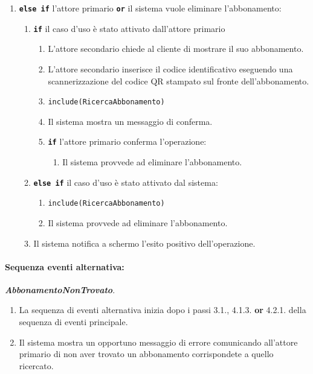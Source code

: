 \documentclass{article}
\begin{document}
\begin{enumerate}[itemsep=8pt,parsep=0pt]
  		\item \texttt{\textbf{else if}} l'attore primario  \texttt{\textbf{or}} il sistema vuole eliminare l'abbonamento:
		\begin{enumerate}	[leftmargin=28pt]
		\item \texttt{\textbf{if}} il caso d'uso è stato attivato dall'attore primario
        \begin{enumerate}	[leftmargin=28pt]
				\item L'attore secondario chiede al cliente di mostrare il suo abbonamento.
				\item L'attore secondario inserisce il codice identificativo eseguendo una scannerizzazione del codice QR stampato sul fronte dell'abbonamento.
	       	\item  \texttt{include(RicercaAbbonamento)}
		    \item  Il sistema mostra un messaggio di conferma.
	   		\item \texttt{\textbf{if}}  l'attore primario conferma l'operazione:
	    	\begin{enumerate}	[leftmargin=28pt]
	    	    \item  Il sistema provvede ad eliminare l'abbonamento.
		    \end{enumerate}
		\end{enumerate}
	    \item \texttt{\textbf{else if}} il caso d'uso è stato attivato dal sistema:
        \begin{enumerate}	[leftmargin=28pt]
        	\item  \texttt{include(RicercaAbbonamento)}
	    	 \item  Il sistema provvede ad eliminare l'abbonamento.
	    \end{enumerate}
		\item Il sistema notifica a schermo l'esito positivo dell'operazione.
	    \end{enumerate}
	\end{enumerate}
	
	\paragraph{Sequenza eventi alternativa:} \textbf{\textit{AbbonamentoNonTrovato}}.
	\begin{enumerate}[itemsep=8pt,parsep=0pt]
		\item La sequenza di eventi alternativa inizia dopo i passi 3.1., 4.1.3. \textbf{or} 4.2.1. della sequenza di eventi principale.
		\item Il sistema mostra un opportuno messaggio di errore comunicando all'attore primario di non aver trovato un abbonamento corrispondete a quello ricercato.
	\end{enumerate}
\end{document}

